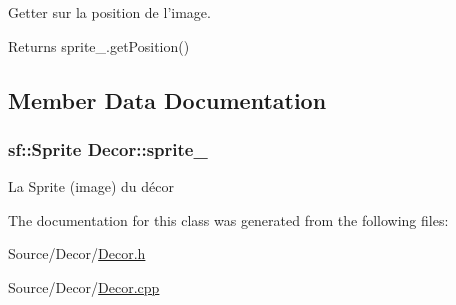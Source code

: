 Getter sur la position de l'image. 

\begin{DoxyReturn}{Returns}
sprite\-\_\-.\-get\-Position() 
\end{DoxyReturn}


\subsection{Member Data Documentation}
\hypertarget{classDecor_a380a2f079cc92f6d0ca9e5e151239efe}{
\subsubsection[{sprite\-\_\-}]{\setlength{\rightskip}{0pt plus 5cm}sf\-::\-Sprite Decor\-::sprite\-\_\-\hspace{0.3cm}{\ttfamily [protected]}}}\label{classDecor_a380a2f079cc92f6d0ca9e5e151239efe}
La Sprite (image) du décor 

The documentation for this class was generated from the following files\-:\begin{DoxyCompactItemize}
\item 
Source/\-Decor/\hyperlink{Decor_8h}{Decor.\-h}\item 
Source/\-Decor/\hyperlink{Decor_2Decor_8cpp}{Decor.\-cpp}\end{DoxyCompactItemize}
